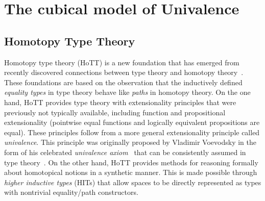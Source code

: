 \setchapterpreamble[u]{\margintoc}
\chapter{The cubical model of Univalence}

\section{Homotopy Type Theory}

Homotopy type theory (HoTT) is a new foundation that has emerged from
recently discovered connections between type theory and homotopy
theory~. These foundations are based on the
observation that the inductively defined \emph{equality types} in type
theory behave like \emph{paths} in homotopy theory. On the one hand,
HoTT provides type theory with extensionality principles that were
previously not typically available, including function and
propositional extensionality (pointwise equal functions and logically
equivalent propositions are equal). These principles follow from a
more general extensionality principle called \emph{univalence}. This
principle was originally proposed by Vladimir Voevodsky in the form of
his celebrated \emph{univalence axiom}~ that can be
consistently assumed in type theory~. On
the other hand, HoTT provides methods for reasoning formally about
homotopical notions in a synthetic manner. This is made possible
through \emph{higher inductive types} (HITs) that allow spaces to be
directly represented as types with nontrivial equality/path
constructors.


